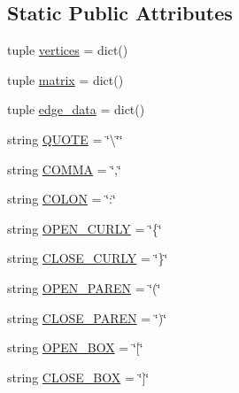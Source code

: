\subsection*{Static Public Attributes}
\begin{DoxyCompactItemize}
\item 
tuple \hyperlink{class_bridges_1_1_graph_adj_matrix_1_1_graph_adj_matrix_afbda1832dbd6451a84f14b0a9f9d40c2}{vertices} = dict()
\item 
tuple \hyperlink{class_bridges_1_1_graph_adj_matrix_1_1_graph_adj_matrix_aeb8bcde3cbbc7783c79f411337bb4e28}{matrix} = dict()
\item 
tuple \hyperlink{class_bridges_1_1_graph_adj_matrix_1_1_graph_adj_matrix_a8fd31af6ada1c3d5d7651a51376ac722}{edge\+\_\+data} = dict()
\item 
string \hyperlink{class_bridges_1_1_graph_adj_matrix_1_1_graph_adj_matrix_aad5594a6c184b153400b3f411146644b}{Q\+U\+O\+T\+E} = \char`\"{}\textbackslash{}\char`\"{}\char`\"{}
\item 
string \hyperlink{class_bridges_1_1_graph_adj_matrix_1_1_graph_adj_matrix_a828653db54670bf3da9f725f1e8b736f}{C\+O\+M\+M\+A} = \char`\"{},\char`\"{}
\item 
string \hyperlink{class_bridges_1_1_graph_adj_matrix_1_1_graph_adj_matrix_a6415f8e168c205e6ada78ac07b2f18f7}{C\+O\+L\+O\+N} = \char`\"{}\+:\char`\"{}
\item 
string \hyperlink{class_bridges_1_1_graph_adj_matrix_1_1_graph_adj_matrix_a4f407fe6617f2988b5db449380f7077e}{O\+P\+E\+N\+\_\+\+C\+U\+R\+L\+Y} = \char`\"{}\{\char`\"{}
\item 
string \hyperlink{class_bridges_1_1_graph_adj_matrix_1_1_graph_adj_matrix_ad27d638fec7c9bf57e7b94682ad86e2d}{C\+L\+O\+S\+E\+\_\+\+C\+U\+R\+L\+Y} = \char`\"{}\}\char`\"{}
\item 
string \hyperlink{class_bridges_1_1_graph_adj_matrix_1_1_graph_adj_matrix_a952d2c21f82d0ce076778fb545c23a55}{O\+P\+E\+N\+\_\+\+P\+A\+R\+E\+N} = \char`\"{}(\char`\"{}
\item 
string \hyperlink{class_bridges_1_1_graph_adj_matrix_1_1_graph_adj_matrix_a610129cf7cc519c991029d3ca1c8271f}{C\+L\+O\+S\+E\+\_\+\+P\+A\+R\+E\+N} = \char`\"{})\char`\"{}
\item 
string \hyperlink{class_bridges_1_1_graph_adj_matrix_1_1_graph_adj_matrix_a4a85971973e325359a88a616a1a40e4b}{O\+P\+E\+N\+\_\+\+B\+O\+X} = \char`\"{}\mbox{[}\char`\"{}
\item 
string \hyperlink{class_bridges_1_1_graph_adj_matrix_1_1_graph_adj_matrix_a4d92a6f7675d067d79b39029a13a0372}{C\+L\+O\+S\+E\+\_\+\+B\+O\+X} = \char`\"{}\mbox{]}\char`\"{}
\end{DoxyCompactItemize}



